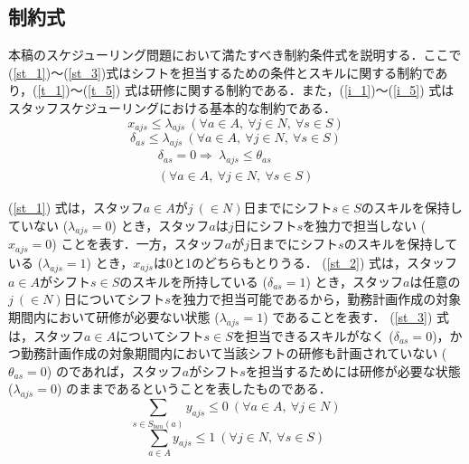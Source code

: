 \documentclass[twocolumn]{jsarticle}
\begin{document}
\subsection{制約式}
本稿のスケジューリング問題において満たすべき制約条件式を説明する．ここで(\ref{st_1})～(\ref{st_3})式はシフトを担当するための条件とスキルに関する制約であり，(\ref{t_1})～(\ref{t_5}) 式は研修に関する制約である．また，(\ref{i_1})～(\ref{i_5}) 式はスタッフスケジューリングにおける基本的な制約である．
\begin{equation}
x_{ajs} \leq \lambda_{ajs} \ (\forall a \in A , \ \forall j \in N, \ \forall s \in S)
\label{st_1}
\end{equation}
\begin{equation}
\delta_{as} \leq \lambda_{ajs} \ (\forall a \in A, \ \forall j \in N, \ \forall s \in S)
\label{st_2}
\end{equation}
\begin{eqnarray}
\delta_{as} = 0 \Rightarrow \ \lambda_{ajs} \leq \theta_{as} \nonumber \\
(\forall a \in A, \ \forall j \in N, \ \forall s \in S)
\label{st_3}
\end{eqnarray}

 (\ref{st_1}) 式は，スタッフ$a \in A$が$j \ (\in N)$日までにシフト$s \in S$のスキルを保持していない ($\lambda_{ajs} = 0$) とき，スタッフ$a$は$j$日にシフト$s$を独力で担当しない ($x_{ajs} = 0$) ことを表す．一方，スタッフ$a$が$j$日までにシフト$s$のスキルを保持している ($\lambda_{ajs} = 1$) とき，$x_{ajs}$は0と1のどちらもとりうる． (\ref{st_2}) 式は，スタッフ$a \in A$がシフト$s \in S$のスキルを所持している ($\delta_{as} = 1$) とき，スタッフ$a$は任意の$j \ (\in N)$日についてシフト$s$を独力で担当可能であるから，勤務計画作成の対象期間内において研修が必要ない状態 ($\lambda_{ajs} = 1$) であることを表す． (\ref{st_3}) 式は，スタッフ$a \in A$についてシフト$s \in S$を担当できるスキルがなく ($\delta_{as} = 0$)，かつ勤務計画作成の対象期間内において当該シフトの研修も計画されていない ($\theta_{as} = 0$) のであれば，スタッフ$a$がシフト$s$を担当するためには研修が必要な状態 ($\lambda_{ajs} = 0$) のままであるということを表したものである．
\begin{equation}
\sum_{s \in S_{ban}(a)} y_{ajs} \leq 0 \ (\forall a \in A, \ \forall j \in N)
\label{t_1}
\end{equation}
\begin{equation}
\sum_{a \in A} y_{ajs} \leq 1 \ (\forall j \in N, \ \forall s \in S)
\label{t_2}
\end{equation}
\end{document}
